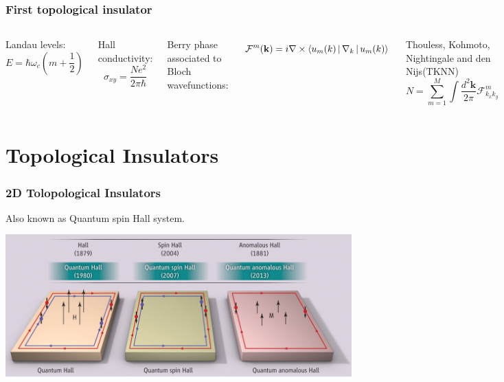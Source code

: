 \begin{frame}
    \frametitle{First topological insulator}

    \begin{columns}

        Landau levels:
        \begin{equation}
            E = \hbar \omega_c \left( m +  \frac{1}{2}\right) \nonumber
        \end{equation}

        Hall conductivity:
        \begin{equation}
            \sigma_{xy} = \frac{Ne^2}{2\pi\hbar} \nonumber
        \end{equation}


    Berry phase associated to Bloch wavefunctions:

    \begin{equation}
        \mathcal{F}^m(\mathbf{k}) = i \nabla \times \Braket{u_m(k)|\nabla_k|u_m(k)} \nonumber
    \end{equation}

    \begin{block}{Thouless, Kohmoto, Nightingale and den Nijs(TKNN)}
        \[N =  \sum_{m=1}^{M} \int \frac{d^2\mathbf{k}}{2\pi}  \mathcal{F}^m_{k_xk_y} \]
    \end{block}

    \end{columns}

\end{frame}




\section{Topological Insulators}

\begin{frame}
    \frametitle{2D Tolopological Insulators}

        Also known as Quantum spin Hall system.

        \includegraphics[width=\textwidth]{phases_of_matter/different_hall_effects.jpg}

\end{frame}

